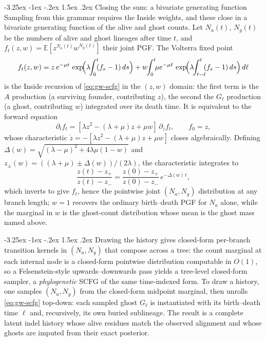 \documentclass[11pt]{article}
\makeatletter
\renewcommand\paragraph{\@startsection{paragraph}{4}{\z@}%
  {-3.25ex \@plus -1ex \@minus -.2ex}%
  {1.5ex \@plus .2ex}%
  {\normalfont\normalsize\bfseries}}
\newcommand{\E}{\mathbb{E}}
\newcommand{\ins}{\lambda}
\newcommand{\del}{\mu}
\makeatother
\begin{document}
\paragraph{Closing the sum: a bivariate generating function}
Sampling from this grammar requires the Inside weights, and these close
in a bivariate generating function of the alive and ghost counts.
Let $N_a(t)$, $N_g(t)$ be the numbers of alive and ghost lineages
after time $t$, and $f_t(z,w)=\E[z^{N_a(t)}w^{N_g(t)}]$ their joint PGF.
The Volterra fixed point
\begin{equation}
\label{eq:volterra}
f_t(z,w) = z\,e^{-\del t}\,\exp\!\Bigl(\ins\!\!\int_0^{t}\!\! (f_s - 1)\, ds\Bigr)
  + w\!\!\int_0^{t}\!\!\del e^{-\del\ell}\,\exp\!\Bigl(\ins\!\!\int_{t-\ell}^{t}\!\! (f_s - 1)\, ds\Bigr)\,d\ell
\end{equation}
is the Inside recursion of \eqref{eq:gw-scfg} in the $(z,w)$ domain: the
first term is the $A$ production (a surviving founder, contributing $z$),
the second the $G_\ell$ production (a ghost, contributing $w$)
integrated over its death time. It is equivalent to the forward equation
\begin{equation}
\label{eq:riccati}
\partial_t f_t = [\ins z^2 - (\ins{+}\del) z + \del w]\,\partial_z f_t,
\qquad f_0 = z,
\end{equation}
whose characteristic $\dot z=-[\ins z^2 - (\ins{+}\del)z + \del w]$
closes algebraically. Defining
$\Delta(w)=\sqrt{(\ins{-}\del)^2 + 4\ins\del(1-w)}$ and
$z_\pm(w)=((\ins{+}\del)\pm\Delta(w))/(2\ins)$, the characteristic
integrates to
\begin{equation}
\label{eq:riccati-flow}
\frac{z(t) - z_+}{z(t) - z_-}
= \frac{z(0) - z_+}{z(0) - z_-}\,e^{-\Delta(w)\, t},
\end{equation}
which inverts to give $f_t$, hence the pointwise joint $(N_a,N_g)$
distribution at any branch length; $w{=}1$ recovers the ordinary birth--death PGF for $N_a$
alone, while the marginal in $w$ is the ghost-count distribution
whose mean is the ghost mass named above.

\paragraph{Drawing the history}
 gives closed-form per-branch transition kernels
in $(N_a,N_g)$ that compose across a tree: the count marginal at each
internal node is a closed-form pointwise distribution computable in
$O(1)$, so a Felsenstein-style upwards--downwards pass yields a
tree-level closed-form sampler, a \emph{phylogenetic} SCFG of the same
time-indexed form. To draw a history, one samples $(N_a,N_g)$ from the
closed-form midpoint marginal, then unrolls \eqref{eq:gw-scfg} top-down:
each sampled ghost $G_\ell$ is instantiated with its birth--death
time $\ell$ and, recursively, its own buried sublineage. The result is a
complete latent indel history whose alive residues match the observed
alignment and whose ghosts are imputed from their exact posterior.
\end{document}
